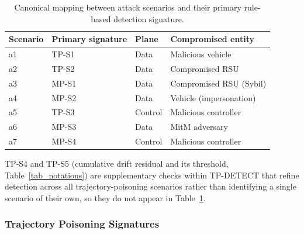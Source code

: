 \documentclass[12pt, a4paper]{report}
\begin{document}
\begin{table}[H]
\centering
\caption{Canonical mapping between attack scenarios and their primary
rule-based detection signature.}
\label{tab:signature-naming}
\renewcommand{\arraystretch}{1.2}
\begin{tabular}{|l|l|l|l|}
\hline
\textbf{Scenario} & \textbf{Primary signature} & \textbf{Plane} & \textbf{Compromised entity} \\
\hline
a1 & TP-S1 & Data  & Malicious vehicle \\
\hline
a2 & TP-S2 & Data  & Compromised RSU \\
\hline
a3 & MP-S1 & Data  & Compromised RSU (Sybil) \\
\hline
a4 & MP-S2 & Data  & Vehicle (impersonation) \\
\hline
a5 & TP-S3 & Control & Malicious controller \\
\hline
a6 & MP-S3 & Data  & MitM adversary \\
\hline
a7 & MP-S4 & Control & Malicious controller \\
\hline
\end{tabular}
\end{table}
TP-S4 and TP-S5 (cumulative drift residual and its threshold,
Table~\ref{tab_notations}) are supplementary checks within
TP-DETECT that refine detection across all trajectory-poisoning
scenarios rather than identifying a single scenario of their own, so
they do not appear in Table~\ref{tab:signature-naming}.

\subsubsection{Trajectory Poisoning Signatures}
\end{document}
